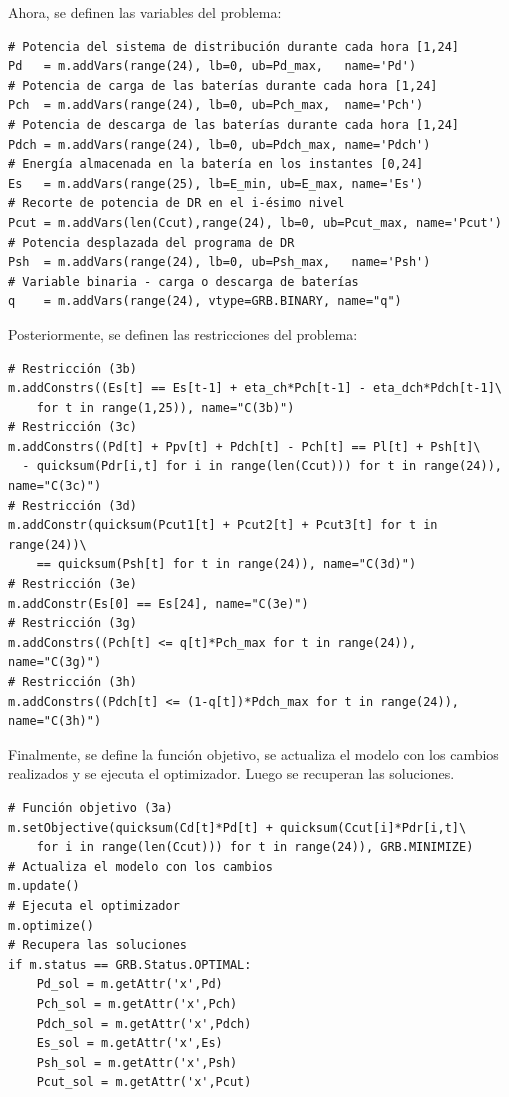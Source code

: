 Ahora, se definen las variables del problema:
\begin{verbatim}
# Potencia del sistema de distribución durante cada hora [1,24]
Pd   = m.addVars(range(24), lb=0, ub=Pd_max,   name='Pd')
# Potencia de carga de las baterías durante cada hora [1,24]
Pch  = m.addVars(range(24), lb=0, ub=Pch_max,  name='Pch')
# Potencia de descarga de las baterías durante cada hora [1,24]
Pdch = m.addVars(range(24), lb=0, ub=Pdch_max, name='Pdch')
# Energía almacenada en la batería en los instantes [0,24]
Es   = m.addVars(range(25), lb=E_min, ub=E_max, name='Es')
# Recorte de potencia de DR en el i-ésimo nivel
Pcut = m.addVars(len(Ccut),range(24), lb=0, ub=Pcut_max, name='Pcut')
# Potencia desplazada del programa de DR
Psh  = m.addVars(range(24), lb=0, ub=Psh_max,   name='Psh')
# Variable binaria - carga o descarga de baterías
q    = m.addVars(range(24), vtype=GRB.BINARY, name="q")
\end{verbatim}

Posteriormente, se definen las restricciones del problema:
\begin{verbatim}
# Restricción (3b)
m.addConstrs((Es[t] == Es[t-1] + eta_ch*Pch[t-1] - eta_dch*Pdch[t-1]\
    for t in range(1,25)), name="C(3b)")
# Restricción (3c)
m.addConstrs((Pd[t] + Ppv[t] + Pdch[t] - Pch[t] == Pl[t] + Psh[t]\
  - quicksum(Pdr[i,t] for i in range(len(Ccut))) for t in range(24)), name="C(3c)")
# Restricción (3d)
m.addConstr(quicksum(Pcut1[t] + Pcut2[t] + Pcut3[t] for t in range(24))\
    == quicksum(Psh[t] for t in range(24)), name="C(3d)")
# Restricción (3e)
m.addConstr(Es[0] == Es[24], name="C(3e)")
# Restricción (3g)
m.addConstrs((Pch[t] <= q[t]*Pch_max for t in range(24)), name="C(3g)")
# Restricción (3h)
m.addConstrs((Pdch[t] <= (1-q[t])*Pdch_max for t in range(24)), name="C(3h)")
\end{verbatim}

Finalmente, se define la función objetivo, se actualiza el modelo con los cambios realizados y se ejecuta el optimizador. Luego se recuperan las soluciones.
\begin{verbatim}
# Función objetivo (3a)
m.setObjective(quicksum(Cd[t]*Pd[t] + quicksum(Ccut[i]*Pdr[i,t]\
    for i in range(len(Ccut))) for t in range(24)), GRB.MINIMIZE)
# Actualiza el modelo con los cambios
m.update()
# Ejecuta el optimizador
m.optimize()
# Recupera las soluciones
if m.status == GRB.Status.OPTIMAL:
    Pd_sol = m.getAttr('x',Pd)
    Pch_sol = m.getAttr('x',Pch)
    Pdch_sol = m.getAttr('x',Pdch)
    Es_sol = m.getAttr('x',Es)
    Psh_sol = m.getAttr('x',Psh)
    Pcut_sol = m.getAttr('x',Pcut)
\end{verbatim}

